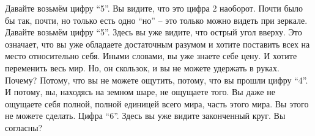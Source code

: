   Давайте возьмём цифру ``5''. Вы видите, что это цифра 2 наоборот. Почти было бы так, почти, но только есть одно ``но'' – это только можно видеть при зеркале. Давайте возьмём цифру ``5''.  Здесь вы уже видите, что острый угол вверху. Это означает, что вы уже обладаете достаточным разумом и хотите поставить всех на место относительно себя. Иными словами, вы уже знаете себе цену. И хотите переменить весь мир. Но, он скользок, и вы не можете удержать в руках. Почему? Потому, что вы не можете ощутить, потому, что вы прошли цифру ``4''. И потому, вы, находясь на земном шаре, не ощущаете того. Вы даже не ощущаете себя полной, полной единицей всего мира, часть этого мира. Вы этого не можете сделать. 
  Цифра ``6''. Здесь  вы уже видите законченный круг. Вы согласны?
  
  
